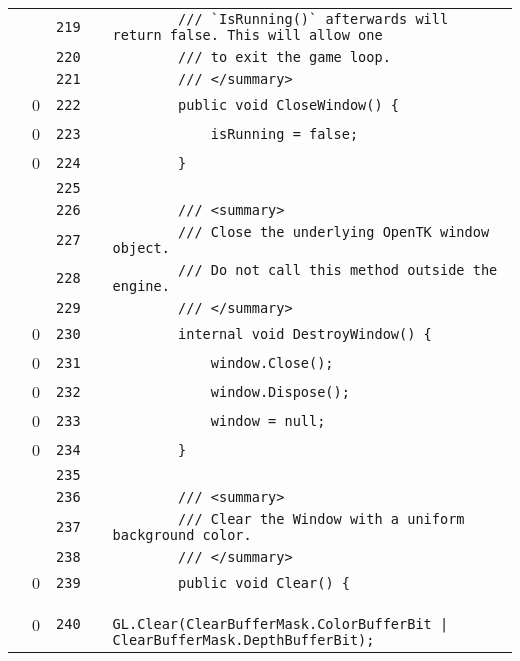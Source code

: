\documentclass[a4paper,landscape,10pt]{article}
\begin{document}
\begin{longtable}[l]{lrrll}
\cellcolor{gray} &  & \verb~219~ & & \verb~        /// `IsRunning()` afterwards will return false. This will allow one~\\
\cellcolor{gray} &  & \verb~220~ & & \verb~        /// to exit the game loop.~\\
\cellcolor{gray} &  & \verb~221~ & & \verb~        /// </summary>~\\
\cellcolor{red} & 0 & \verb~222~ & & \verb~        public void CloseWindow() {~\\
\cellcolor{red} & 0 & \verb~223~ & & \verb~            isRunning = false;~\\
\cellcolor{red} & 0 & \verb~224~ & & \verb~        }~\\
\cellcolor{gray} &  & \verb~225~ & & \verb~~\\
\cellcolor{gray} &  & \verb~226~ & & \verb~        /// <summary>~\\
\cellcolor{gray} &  & \verb~227~ & & \verb~        /// Close the underlying OpenTK window object.~\\
\cellcolor{gray} &  & \verb~228~ & & \verb~        /// Do not call this method outside the engine.~\\
\cellcolor{gray} &  & \verb~229~ & & \verb~        /// </summary>~\\
\cellcolor{red} & 0 & \verb~230~ & & \verb~        internal void DestroyWindow() {~\\
\cellcolor{red} & 0 & \verb~231~ & & \verb~            window.Close();~\\
\cellcolor{red} & 0 & \verb~232~ & & \verb~            window.Dispose();~\\
\cellcolor{red} & 0 & \verb~233~ & & \verb~            window = null;~\\
\cellcolor{red} & 0 & \verb~234~ & & \verb~        }~\\
\cellcolor{gray} &  & \verb~235~ & & \verb~~\\
\cellcolor{gray} &  & \verb~236~ & & \verb~        /// <summary>~\\
\cellcolor{gray} &  & \verb~237~ & & \verb~        /// Clear the Window with a uniform background color.~\\
\cellcolor{gray} &  & \verb~238~ & & \verb~        /// </summary>~\\
\cellcolor{red} & 0 & \verb~239~ & & \verb~        public void Clear() {~\\
\cellcolor{red} & 0 & \verb~240~ & & \verb~            GL.Clear(ClearBufferMask.ColorBufferBit | ClearBufferMask.DepthBufferBit);~\\

\end{longtable}
\end{document}
